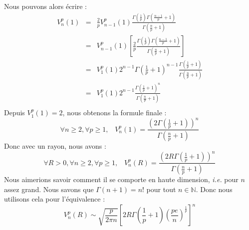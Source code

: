 Nous pouvons alors écrire :
\begin{eqnarray*}
V_n^p(1) &=& \frac{2}{p} V_{n-1}^p(1) \frac{\Gamma\left(\frac{1}{p}\right)\Gamma\left(\frac{n-1}{p}+1\right)}{\Gamma\left(\frac{n}{p} + 1\right)}
\\
&=& V_{n-1}^p(1) \left[\frac{2}{p} \frac{\Gamma\left(\frac{1}{p}\right)\Gamma\left(\frac{n-1}{p}+1\right)}{\Gamma\left(\frac{n}{p} + 1\right)} \right]
\\
&=& V_1^p(1)2^{n-1}\Gamma\left(\frac{1}{p}+1\right)^{n-1} \frac{\Gamma\left(\frac{1}{p}+1\right)}{\Gamma\left(\frac{n}{p}+1\right)}
\\
&=& V_1^p(1)2^{n-1}\frac{\Gamma\left(\frac{1}{p}+1\right)^n}{\Gamma\left(\frac{n}{p}+1\right)}
\\
\end{eqnarray*}
Depuis $V_1^p(1) = 2$, nous obtenons la formule finale : 
\begin{equation*} \forall n\geqslant 2, \forall p\geqslant 1,  \; \; \;  V_n^p(1) = \frac{\left(2\Gamma\left(\frac{1}{p}+1\right)\right)^n}{\Gamma\left(\frac{n}{p}+1\right)} \end{equation*}
Donc avec un rayon, nous avons :
\\
\begin{equation} \forall R>0, \forall n\geqslant 2, \forall p\geqslant 1, \; \; \; V_n^p(R) = \frac{\left(2R\Gamma\left(\frac{1}{p}+1\right)\right)^n}{\Gamma\left(\frac{n}{p}+1\right)} \end{equation}
Nous aimerions savoir comment il se comporte en haute dimension, \textit{i.e.} pour $n$ assez grand. Nous savons que $\Gamma(n+1) = n!$ pour tout $n\in\mathbb{N}$. Donc nous utilisons cela pour l'équivalence :
\\
\begin{equation} 
V_n^p(R) \sim \sqrt{\frac{p}{2\pi n}} \left[2R\Gamma\left(\frac{1}{p}+1\right) \left(\frac{pe}{n}\right)^{\frac{1}{p}}\right]^n 
\end{equation}




